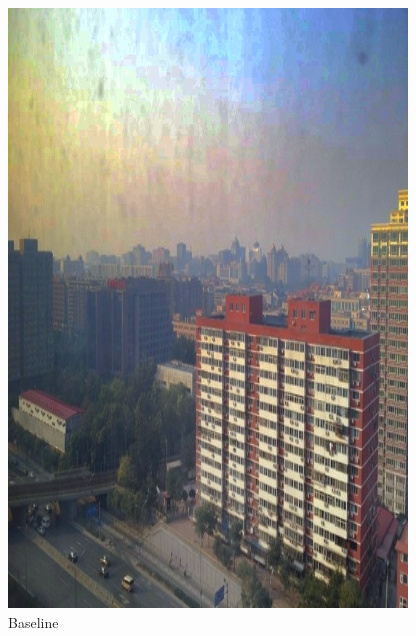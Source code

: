 \documentclass[12pt]{article}
\begin{document}
\begin{figure}[!h]
\begin{minipage}[t]{0.24\linewidth}
        \includegraphics[width=0.9\linewidth]{sample_pictures/after_RESIDE_Baseline.jpg}
        \caption*{Baseline}
    \end{minipage}
    \begin{minipage}[t]{0.24\linewidth}
        \centering

\end{minipage}
\end{figure}
\end{document}
